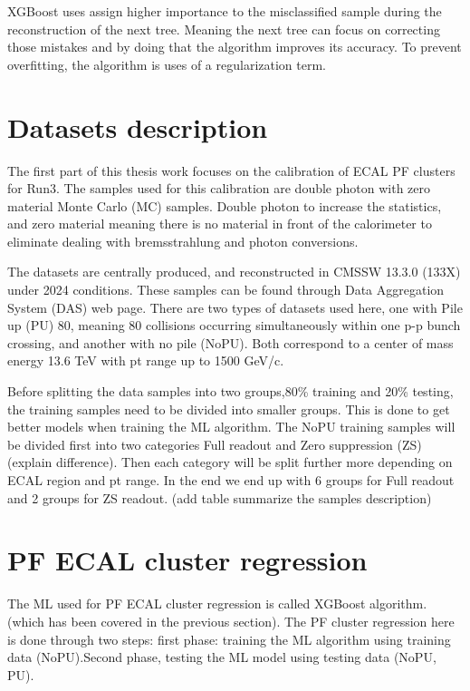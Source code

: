 XGBoost uses assign higher importance to the misclassified sample during the reconstruction of the next tree. Meaning the next tree can focus on correcting those mistakes and by doing that the algorithm improves its accuracy. To prevent overfitting, the algorithm is uses of a regularization term.


\section{Datasets description}

The first part of this thesis work focuses on the calibration of ECAL PF clusters for Run3. The samples used for this calibration are double photon with zero material Monte Carlo (MC) samples. Double photon to increase the statistics, and zero material meaning there is no material in front of the calorimeter to eliminate dealing with bremsstrahlung and photon conversions.

The datasets are centrally produced, and reconstructed in CMSSW 13.3.0 (133X) under 2024 conditions. These samples can be found through Data Aggregation System (DAS) web page. There are two types of datasets used here, one with Pile up (PU) 80, meaning 80 collisions occurring simultaneously within one p-p bunch crossing, %
and another with no pile (NoPU). Both correspond to a center of mass energy 13.6 TeV with pt range up to 1500 GeV/c.

Before splitting the data samples into two groups,80\% training and 20\% testing, the training samples need to be divided into smaller groups. This is done to get better models when training the ML algorithm. The NoPU training samples will be divided first into two categories Full readout and Zero suppression (ZS) (explain difference). %
Then each category will be split further more depending on ECAL region and pt range. In the end we end up with 6 groups for Full readout and 2 groups for ZS readout. (add table summarize the samples description)  


\section{PF ECAL cluster regression}
The ML used for PF ECAL cluster regression is called XGBoost algorithm. (which has been covered in the previous section). The PF cluster regression here is done through two steps: first phase: training the ML algorithm using training data (NoPU).Second phase, testing the ML model using testing data (NoPU, PU).

